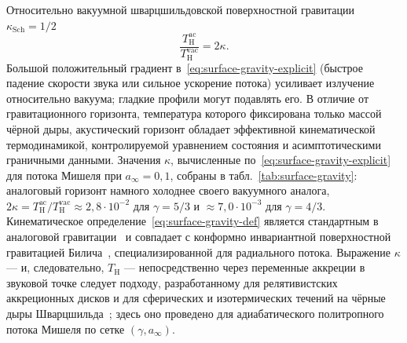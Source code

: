 \documentclass[12pt,a4paper,preprint]{elsarticle}
\begin{document}
            Относительно вакуумной шварцшильдовской поверхностной гравитации $\kappa_{\mathrm{Sch}}=1/2$
            \begin{equation}
                \frac{T^{\mathrm{ac}}_{\mathrm{H}}}{T^{\mathrm{vac}}_{\mathrm{H}}} = 2\kappa .
                \label{eq:temperature-ratio}
            \end{equation}
            Большой положительный градиент в~\eqref{eq:surface-gravity-explicit} (быстрое падение скорости звука или сильное ускорение потока) усиливает излучение относительно вакуума; гладкие профили могут подавлять его. В отличие от гравитационного горизонта, температура которого фиксирована только массой чёрной дыры, акустический горизонт обладает эффективной кинематической термодинамикой, контролируемой уравнением состояния и асимптотическими граничными данными. Значения $\kappa$, вычисленные по~\eqref{eq:surface-gravity-explicit} для потока Мишеля при $a_{\infty}=0{,}1$, собраны в табл.~\ref{tab:surface-gravity}: аналоговый горизонт намного холоднее своего вакуумного аналога, $2\kappa=T^{\mathrm{ac}}_{\mathrm{H}}/T^{\mathrm{vac}}_{\mathrm{H}}\approx 2{,}8\cdot 10^{-2}$ для $\gamma=5/3$ и $\approx 7{,}0\cdot 10^{-3}$ для $\gamma=4/3$. Кинематическое определение~\eqref{eq:surface-gravity-def} является стандартным в аналоговой гравитации~\cite{UnruhWG_ExperimentalBlackHoleEvaporation_1981, VisserM_AcousticBlackHolesHorizonsErgospheresAndHawkingRadiation_1998} и совпадает с конформно инвариантной поверхностной гравитацией Билича~\cite{BilicN_RelativisticAcousticGeometry_1999}, специализированной для радиального потока. Выражение $\kappa$ --- и, следовательно, $T_{\mathrm{H}}$ --- непосредственно через переменные аккреции в звуковой точке следует подходу, разработанному для релятивистских аккреционных дисков и для сферических и изотермических течений на чёрные дыры Шварцшильда~\cite{DasTK_BilicN_DasguptaS_BlackHoleAccretionDiscAsAnAnalogueGravityModel_2007, TarafdarP_DasTK_GeometricConfigurationOfMatterForAxiallySymmetricBackgroundFlowsInTheSchwarzschildMetric_2013, ShaikhMA_FirdousiI_DasTK_RelativisticSonicGeometryForIsothermalAccretionInTheSchwarzschildMetric_2017}; здесь оно проведено для адиабатического политропного потока Мишеля по сетке $(\gamma,a_{\infty})$.
\end{document}

